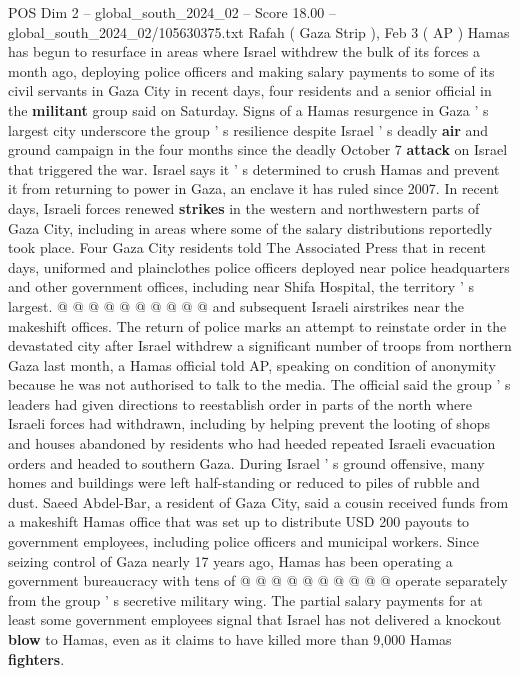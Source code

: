 \begin{textsample}{POS Dim 2 – global\_south\_2024\_02 – Score 18.00 – global\_south\_2024\_02/105630375.txt}  \label{ex:f2_pos_198}
Rafah ( Gaza Strip ), Feb 3 ( AP ) Hamas has begun to resurface in areas where Israel withdrew the bulk of its forces a month ago, deploying police officers and making salary payments to some of its civil servants in Gaza City in recent days, four residents and a senior official in the \textbf{militant} group said on Saturday.
Signs of a Hamas resurgence in Gaza ' s largest city underscore the group ' s resilience despite Israel ' s deadly \textbf{air} and ground campaign in the four months since the deadly October 7 \textbf{attack} on Israel that triggered the war.
Israel says it ' s determined to crush Hamas and prevent it from returning to power in Gaza, an enclave it has ruled since 2007.
In recent days, Israeli forces renewed \textbf{strikes} in the western and northwestern parts of Gaza City, including in areas where some of the salary distributions reportedly took place.
Four Gaza City residents told The Associated Press that in recent days, uniformed and plainclothes police officers deployed near police headquarters and other government offices, including near Shifa Hospital, the territory ' s largest. @ @ @ @ @ @ @ @ @ @ and subsequent Israeli airstrikes near the makeshift offices.
The return of police marks an attempt to reinstate order in the devastated city after Israel withdrew a significant number of troops from northern Gaza last month, a Hamas official told AP, speaking on condition of anonymity because he was not authorised to talk to the media.
The official said the group ' s leaders had given directions to reestablish order in parts of the north where Israeli forces had withdrawn, including by helping prevent the looting of shops and houses abandoned by residents who had heeded repeated Israeli evacuation orders and headed to southern Gaza.
During Israel ' s ground offensive, many homes and buildings were left half-standing or reduced to piles of rubble and dust.
Saeed Abdel-Bar, a resident of Gaza City, said a cousin received funds from a makeshift Hamas office that was set up to distribute USD 200 payouts to government employees, including police officers and municipal workers.
Since seizing control of Gaza nearly 17 years ago, Hamas has been operating a government bureaucracy with tens of @ @ @ @ @ @ @ @ @ @ operate separately from the group ' s secretive military wing.
The partial salary payments for at least some government employees signal that Israel has not delivered a knockout \textbf{blow} to Hamas, even as it claims to have killed more than 9,000 Hamas \textbf{fighters}.

\end{textsample}
